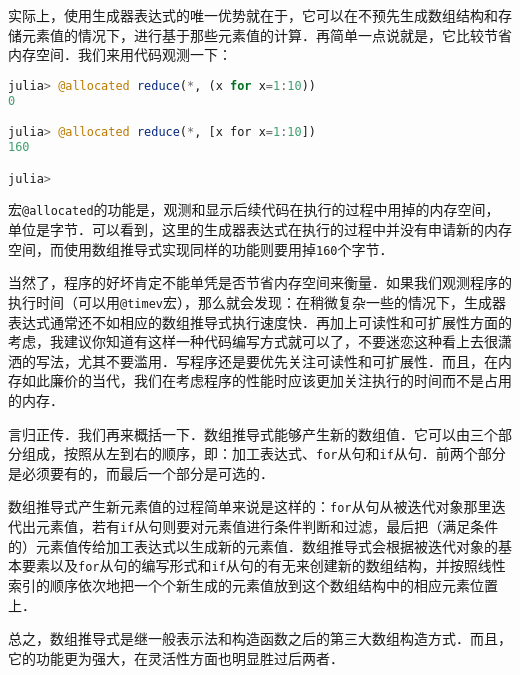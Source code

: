 实际上，使用生成器表达式的唯一优势就在于，它可以在不预先生成数组结构和存储元素值的情况下，进行基于那些元素值的计算．再简单一点说就是，它比较节省内存空间．我们来用代码观测一下：

\begin{lstlisting}[language=julia]
julia> @allocated reduce(*, (x for x=1:10))
0

julia> @allocated reduce(*, [x for x=1:10])
160

julia> 
\end{lstlisting}

宏\verb|@allocated|的功能是，观测和显示后续代码在执行的过程中用掉的内存空间，单位是字节．可以看到，这里的生成器表达式在执行的过程中并没有申请新的内存空间，而使用数组推导式实现同样的功能则要用掉\verb|160|个字节．

当然了，程序的好坏肯定不能单凭是否节省内存空间来衡量．如果我们观测程序的执行时间（可以用\verb|@timev|宏），那么就会发现：在稍微复杂一些的情况下，生成器表达式通常还不如相应的数组推导式执行速度快．再加上可读性和可扩展性方面的考虑，我建议你知道有这样一种代码编写方式就可以了，不要迷恋这种看上去很潇洒的写法，尤其不要滥用．写程序还是要优先关注可读性和可扩展性．而且，在内存如此廉价的当代，我们在考虑程序的性能时应该更加关注执行的时间而不是占用的内存．

言归正传．我们再来概括一下．数组推导式能够产生新的数组值．它可以由三个部分组成，按照从左到右的顺序，即：加工表达式、\verb|for|从句和\verb|if|从句．前两个部分是必须要有的，而最后一个部分是可选的．

数组推导式产生新元素值的过程简单来说是这样的：\verb|for|从句从被迭代对象那里迭代出元素值，若有\verb|if|从句则要对元素值进行条件判断和过滤，最后把（满足条件的）元素值传给加工表达式以生成新的元素值．数组推导式会根据被迭代对象的基本要素以及\verb|for|从句的编写形式和\verb|if|从句的有无来创建新的数组结构，并按照线性索引的顺序依次地把一个个新生成的元素值放到这个数组结构中的相应元素位置上．

总之，数组推导式是继一般表示法和构造函数之后的第三大数组构造方式．而且，它的功能更为强大，在灵活性方面也明显胜过后两者．